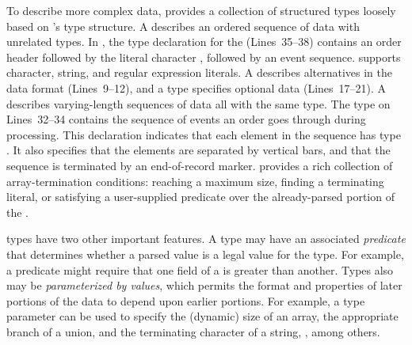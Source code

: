 
To describe more complex data, \pads{} provides a collection of
structured types loosely based on \C{}'s type structure.  A
 describes an ordered sequence of data with unrelated
types.  In , the type declaration for the
  (Lines~35--38) contains an order header
followed by the literal character , followed by an event
sequence. \pads{} supports character, string, and regular expression
literals.  A  describes alternatives in the data format
(Lines~9--12), and a  type specifies optional data
(Lines~17--21).  A  describes varying-length sequences of
data all with the same type.  The  type on Lines~32--34
contains the sequence of events an order goes through during
processing.  This declaration indicates that each element in the
sequence has type .  It also specifies that the elements
are separated by vertical bars, and that the sequence is terminated by
an end-of-record marker.  \pads{} provides a rich collection of
array-termination conditions: reaching a maximum size, finding a
terminating literal, or satisfying a user-supplied predicate over the
already-parsed portion of the .

\pads{} types have two other important features.  A type may have an
associated \emph{predicate} that determines whether a parsed value is
a legal value for the type.  For example, a predicate might require
that one field of a  is greater than another.  Types also
may be \emph{parameterized by values}, which permits the format and
properties of later portions of the data to depend upon earlier
portions.  For example, a type parameter can be used to specify the
(dynamic) size of an array, the appropriate branch of a union, and the
terminating character of a string, \eg{} , among
others.



